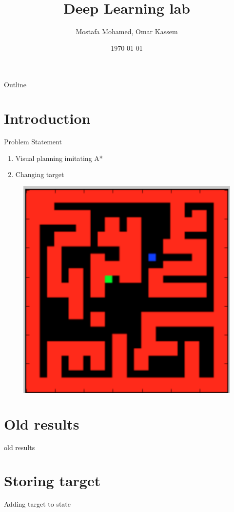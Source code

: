 \documentclass{beamer}
\title[]{Deep Learning lab}
\subtitle{}
\author[Uni-Freiburg]{Mostafa Mohamed, Omar Kassem}
\date{\today}
\institute{Alberts-Ludwig Universt\"at Freiburg}
\begin{document}
\begin{frame}
\titlepage
\end{frame}

\begin{frame}{Outline}
  \setcounter{tocdepth}{1}
  \tableofcontents
\end{frame}

\section{Introduction}
\begin{frame}{Problem Statement}
\begin{enumerate}
\item Visual planning imitating A*
\item Changing target
\end{enumerate}
\begin{figure}
        \includegraphics[width=0.30\linewidth]{problem.png}
    \label{fig1}
\end{figure}
\end{frame}

\section{Old results}
\begin{frame}{old results}
\end{frame}

\section{Storing target}
\begin{frame}{Adding target to state}
\end{frame}
\end{document}
